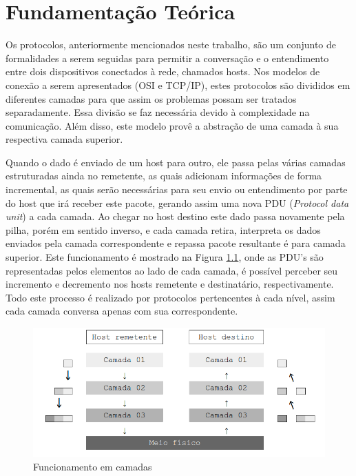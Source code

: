 
\chapter{Fundamentação Teórica}
\label{chap:fundamentacaoTeorica}

Os protocolos, anteriormente mencionados neste trabalho, são um conjunto de formalidades a serem seguidas para permitir a conversação e o entendimento entre dois dispositivos conectados à rede, chamados hosts. Nos modelos de conexão a serem apresentados (OSI e TCP/IP), estes protocolos são divididos em diferentes camadas para que assim os problemas possam ser tratados separadamente. Essa divisão se faz necessária devido à complexidade na comunicação. Além disso, este modelo provê a abstração de uma camada à sua respectiva camada superior.

Quando o dado é enviado de um host para outro, ele passa pelas várias camadas estruturadas ainda no remetente, as quais adicionam informações de forma incremental, as quais serão necessárias para seu envio ou entendimento por parte do host que irá receber este pacote, gerando assim uma nova PDU (\textit{Protocol data unit}) a cada camada. Ao chegar no host destino este dado passa novamente pela pilha, porém em sentido inverso, e cada camada retira, interpreta os dados enviados pela camada correspondente e repassa pacote resultante é para camada superior. Este funcionamento é mostrado na Figura \ref{fig:camadas}, onde as PDU's são representadas pelos elementos ao lado de cada camada, é possível perceber seu incremento e decremento nos hosts remetente e destinatário, respectivamente. 
Todo este processo é realizado por protocolos pertencentes à cada nível, assim cada camada conversa apenas com sua correspondente.

\begin{figure}[H]
	\centering
    \includegraphics[width=\textwidth]{04-figuras/camadas.png}
    \caption{Funcionamento em camadas}
    \label{fig:camadas}
\end{figure}  	 
	 
